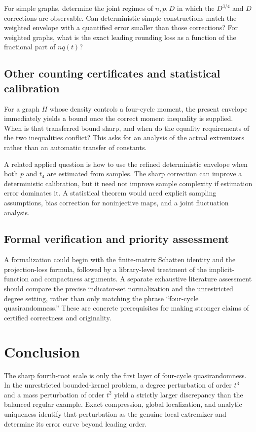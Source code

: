 \documentclass[11pt]{article}
\theoremstyle{definition}
\newcommand{\1}{\mathbf 1}
\begin{document}
For simple graphs, determine the joint regimes of $n,p,D$ in which the $D^{3/4}$ and $D$ corrections are observable. Can deterministic simple constructions match the weighted envelope with a quantified error smaller than those corrections? For weighted graphs, what is the exact leading rounding loss as a function of the fractional part of $nq(t)$?

\subsection{Other counting certificates and statistical calibration}
For a graph $H$ whose density controls a four-cycle moment, the present envelope immediately yields a bound once the correct moment inequality is supplied. When is that transferred bound sharp, and when do the equality requirements of the two inequalities conflict? This asks for an analysis of the actual extremizers rather than an automatic transfer of constants.

A related applied question is how to use the refined deterministic envelope when both $p$ and $t_4$ are estimated from samples. The sharp correction can improve a deterministic calibration, but it need not improve sample complexity if estimation error dominates it. A statistical theorem would need explicit sampling assumptions, bias correction for noninjective maps, and a joint fluctuation analysis.

\subsection{Formal verification and priority assessment}
A formalization could begin with the finite-matrix Schatten identity and the projection-loss formula, followed by a library-level treatment of the implicit-function and compactness arguments. A separate exhaustive literature assessment should compare the precise indicator-set normalization and the unrestricted degree setting, rather than only matching the phrase ``four-cycle quasirandomness.'' These are concrete prerequisites for making stronger claims of certified correctness and originality.

\section{Conclusion}
The sharp fourth-root scale is only the first layer of four-cycle quasirandomness. In the unrestricted bounded-kernel problem, a degree perturbation of order $t^3$ and a mass perturbation of order $t^2$ yield a strictly larger discrepancy than the balanced regular example. Exact compression, global localization, and analytic uniqueness identify that perturbation as the genuine local extremizer and determine its error curve beyond leading order.
\end{document}
